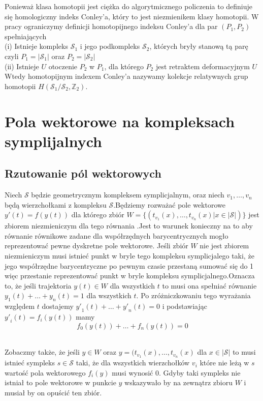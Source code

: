 \documentclass[12pt,a4paper]{article}
\newcommand{\symcom}[1]{\mathcal{#1}}
\newcommand{\set}[1]{ \{#1\}}
\begin{document}
 Ponieważ klasa homotopii jest ciężka do algorytmicznego policzenia to definiuje się homologiczny indeks Conley'a, który to jest niezmienikem klasy homotopii. W pracy ograniczymy definicji homotopijnego indeksu Conley'a dla par $(P_1,P_2)$ spełniających
\\ (i) Istnieje kompleks $\mathcal{S}_1 $ i jego podkompleks $\mathcal{S}_2$, których bryły stanową tą parę czyli $P_1=|\mathcal{S}_1|$ oraz $P_2=|\mathcal{S}_2|$
\noindent
\\(ii) Istnieje $U$ otoczenie $P_2$ w $P_1$, dla którego $P_2$ jest retraktem deformacyjnym $U$ 
\\Wtedy homotopijnym indexem Conley'a nazywamy kolekcje relatywnych grup homotopii $H(\mathcal{S}_1/\mathcal{S}_2,\mathbb{Z}_2)$.


\begin{enumerate}
\end{enumerate}
\begin{enumerate}
\end{enumerate}

\section{Pola wektorowe na kompleksach symplijalnych}
\subsection{Rzutowanie pól wektorowych}
 Niech $\symcom{S}$ będzie geometrycznym kompleksem symplicjalnym, oraz niech $v_1,\ldots,v_n$ będą wierzchołkami z kompleksu $\symcom{S}$.Będziemy rozważać pole wektorowe $y'(t) = f(y(t))$ dla którego zbiór $W=\set{(t_{v_1}(x),\ldots,t_{v_n}(x)|x\in |\symcom{S}|)}$ jest zbiorem niezmieniczym dla tego równania .Jest to warunek konieczny na to aby równanie równikowe zadane dla współrzędnych barycentrycznych mogło reprezentować pewne dyskretne pole wektorowe. Jeśli zbiór $W$ nie jest zbiorem niezmieniczym musi istnieć punkt w bryle tego kompleksu symplicjalego taki, że jego współrzędne barycentryczne po pewnym czasie przestaną sumować się do 1 więc przestanie reprezentować punkt w bryle kompleksu symplicjalnego.Oznacza to, że jeśli trajektoria $y(t)\in W$ dla wszystkich $t$ to musi ona spełniać równanie $y_1(t)+\ldots+y_n(t)=1$ dla wszystkich $t$. Po zróżniczkowaniu tego wyrażania względem $t$ dostajemy ${y'}_1(t)+\ldots+{y'}_n(t)=0$ i podstawiając ${y'}_i(t)=f_i(y(t))$ mamy
$$f_0(y(t))+\ldots+f_n(y(t))=0$$

\\
Zobaczmy także, że jeśli $y\in W$ oraz $y=(t_{v_1}(x),\ldots,t_{v_n}(x)$ dla $x\in|\symcom{S}|$ to musi istnieć sympleks $s\in \symcom{S}$ taki, że dla wszystkich wierzchołków $v_i$ które nie leżą w $s$ wartość pola wektorowego $f_i(y)$ musi wynosić $0$. Gdyby taki sympleks nie istniał to pole wektorowe w punkcie $y$ wskazywało by na zewnątrz zbioru $W$ i musiał by on opuścić ten zbiór.
\end{document}
